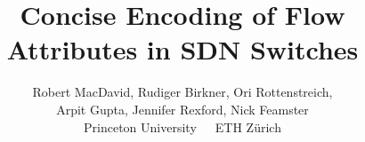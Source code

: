 \documentclass[10pt,twocolumn]{confpaper}
\date{}
\title{
{\ttlfnt Concise Encoding of Flow Attributes in SDN Switches}}
\author{
{\aufnt Robert MacDavid\ptn, Rudiger Birkner\et, Ori Rottenstreich\ptn,}\\
{\aufnt Arpit Gupta\ptn, Jennifer Rexford\ptn, Nick Feamster\ptn}\\
\ptn\normalsize{Princeton University}~~~\et\normalsize{ETH Z\"{u}rich}\\
}
\begin{document}
\maketitle
\thispagestyle{empty}


\begin{sloppypar}












\end{sloppypar}
\balance


%
\end{document}
